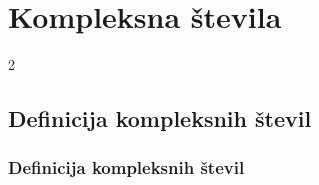 \section{Kompleksna števila}

\begin{frame}
    \sectionpage
\end{frame}

\begin{frame}
    \begin{multicols}{2}
    \end{multicols}
\end{frame}


    \subsection{Definicija kompleksnih števil}

        \begin{frame}
            \frametitle{Definicija kompleksnih števil}
        \end{frame}

        \newpage

